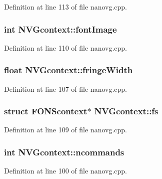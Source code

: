 Definition at line 113 of file nanovg.\+cpp.

\hypertarget{struct_n_v_gcontext_a06c1243e6199595ca2d826ccac3e3431}{
\subsubsection[{font\+Image}]{\setlength{\rightskip}{0pt plus 5cm}int N\+V\+Gcontext\+::font\+Image}}\label{struct_n_v_gcontext_a06c1243e6199595ca2d826ccac3e3431}


Definition at line 110 of file nanovg.\+cpp.

\hypertarget{struct_n_v_gcontext_a3302fa98005c6cb433b79afc87ae6cab}{
\subsubsection[{fringe\+Width}]{\setlength{\rightskip}{0pt plus 5cm}float N\+V\+Gcontext\+::fringe\+Width}}\label{struct_n_v_gcontext_a3302fa98005c6cb433b79afc87ae6cab}


Definition at line 107 of file nanovg.\+cpp.

\hypertarget{struct_n_v_gcontext_ac871fe2ad80359e19231aafeebff0289}{
\subsubsection[{fs}]{\setlength{\rightskip}{0pt plus 5cm}struct F\+O\+N\+Scontext$\ast$ N\+V\+Gcontext\+::fs}}\label{struct_n_v_gcontext_ac871fe2ad80359e19231aafeebff0289}


Definition at line 109 of file nanovg.\+cpp.

\hypertarget{struct_n_v_gcontext_af3583d9602e9ea415b01c2692392a02a}{
\subsubsection[{ncommands}]{\setlength{\rightskip}{0pt plus 5cm}int N\+V\+Gcontext\+::ncommands}}\label{struct_n_v_gcontext_af3583d9602e9ea415b01c2692392a02a}


Definition at line 100 of file nanovg.\+cpp.

